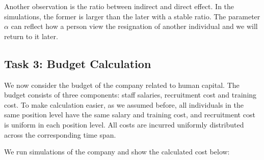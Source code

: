 \documentclass[tcn = 37075, sheet = false, abstract = false]{mcmthesis}
\begin{document}
	Another observation is the ratio between indirect and direct effect. In the simulations, the former is larger than the later with a stable ratio. The parameter $\alpha$ can reflect how a person view the resignation of another individual and we will return to it later.
	
	\subsection{Task 3: Budget Calculation}
	
	We now consider the budget of the company related to human capital. The budget consists of three components: staff salaries, recruitment cost and training cost. To make calculation easier, as we assumed before, all individuals in the same position level have the same salary and training cost, and recruitment cost is uniform in each position level. All costs are incurred uniformly distributed across the corresponding time span.
	
	We run simulations of the company and show the calculated cost below:
	
\end{document}
